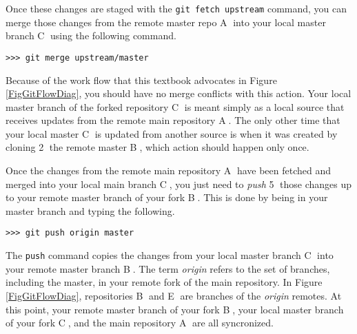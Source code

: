     Once these changes are staged with the \texttt{git fetch upstream} command, you can merge those changes from the remote master repo \textcircled{A} into your local master branch \textcircled{C} using the following command.
    \begin{lstlisting}[frame=single]
      >>> git merge upstream/master
    \end{lstlisting}
    Because of the work flow that this textbook advocates in Figure \ref{FigGitFlowDiag}, you should have no merge conflicts with this action. Your local master branch of the forked repository \textcircled{C} is meant simply as a local source that receives updates from the remote main repository \textcircled{A}. The only other time that your local master \textcircled{C} is updated from another source is when it was created by cloning \textcircled{2} the remote master \textcircled{B}, which action should happen only once.

    Once the changes from the remote main repository \textcircled{A} have been fetched and merged into your local main branch \textcircled{C}, you just need to \textit{push} \textcircled{5} those changes up to your remote master branch of your fork \textcircled{B}. This is done by being in your master branch and typing the following.
    \begin{lstlisting}[frame=single]
      >>> git push origin master
    \end{lstlisting}
    The \texttt{push} command copies the changes from your local master branch \textcircled{C} into your remote master branch \textcircled{B}. The term \textit{origin} refers to the set of branches, including the master, in your remote fork of the main repository. In Figure \ref{FigGitFlowDiag}, repositories \textcircled{B} and \textcircled{E} are branches of the \textit{origin} remotes. At this point, your remote master branch of your fork \textcircled{B}, your local master branch of your fork \textcircled{C}, and the main repository \textcircled{A} are all syncronized.

